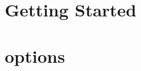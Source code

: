 \documentclass[pdf,12pt,report]{SANDreport}
\begin{document}


    \SANDmain		%


    \chapter{Getting Started}\label{sec:getting started}
    

    \chapter{\ifpacktwo options}
    



    \clearpage
    \providecommand*{\phantomsection}{}
    \phantomsection
    
    


    \appendix
    




    
\end{document}
